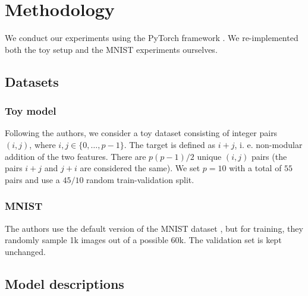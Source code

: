 \section{Methodology}
We conduct our experiments using the PyTorch framework \cite{pytorch}. We re-implemented both the toy setup and the MNIST experiments ourselves.

\subsection{Datasets}

\subsubsection{Toy model} Following the authors, we consider a toy dataset consisting of integer pairs $(i, j)$, where $i, j \in \{0, \dots, p - 1\}$. The target is defined as $i + j$, i. e. non-modular addition of the two features. There are $p(p-1)/2$ unique $(i, j)$ pairs (the pairs $i+j$ and $j+i$ are considered the same). We set $p=10$ with a total of $55$ pairs and use a $45/10$ random train-validation split. 

\subsubsection{MNIST}
The authors use the default version of the MNIST dataset \cite{mnist}, but for training, they randomly sample 1k images out of a possible 60k. The validation set is kept unchanged.

\subsection{Model descriptions}

